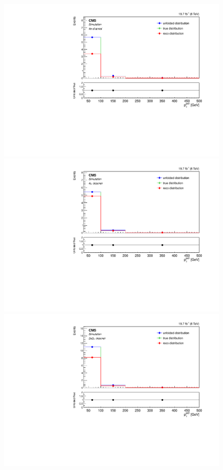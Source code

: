 \begin{figure}[hbtp]
\begin{center}
     \includegraphics[width=0.8\cmsFigWidth]{Figures/Unfolding/MCTests/PtJet2_ZZTo4e_PowMatrix_PowDistr_FullSample_fr}     
    \includegraphics[width=0.8\cmsFigWidth]{Figures/Unfolding/MCTests/PtJet2_ZZTo4m_PowMatrix_PowDistr_FullSample_fr}     
    \includegraphics[width=0.8\cmsFigWidth]{Figures/Unfolding/MCTests/PtJet2_ZZTo2e2m_PowMatrix_PowDistr_FullSample_fr}      

\end{center}
\end{figure}
